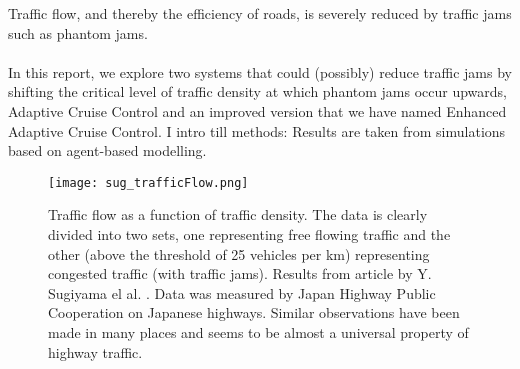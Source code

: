 Traffic flow, and thereby the efficiency of roads, is severely reduced by
traffic jams such as phantom jams.\\\\

In this report, we explore two systems that could (possibly) reduce traffic
jams by shifting the critical level of traffic density at which phantom jams
occur upwards, Adaptive Cruise Control and an improved version that we have
named Enhanced Adaptive Cruise Control. I intro till methods: Results are
taken from simulations based on agent-based modelling.

\begin{figure}[H]
    \begin{center}
    \texttt{[image: sug\_trafficFlow.png]}
    \caption{\label{sug_flow}
Traffic flow as a function of traffic density. The data is clearly divided
into two sets, one representing free flowing traffic and the other (above the
threshold of 25 vehicles per km) representing congested traffic (with traffic
jams).  Results from article by Y. Sugiyama el al. \cite{sugiyama}.  Data was
measured by Japan Highway Public Cooperation on Japanese highways. Similar
observations have been made in many places and seems to be almost a universal
property of highway traffic.}
    \end{center}
\end{figure}

